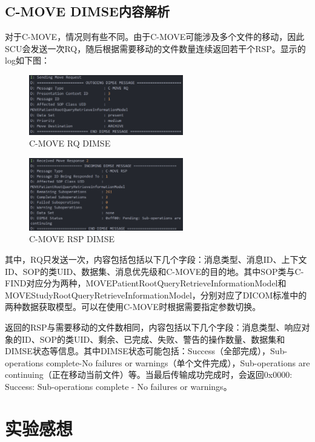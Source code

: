 \documentclass[UTF8]{ctexart}
\begin{document}
\subsection{C-MOVE DIMSE内容解析}
对于C-MOVE，情况则有些不同。由于C-MOVE可能涉及多个文件的移动，因此SCU会发送一次RQ，随后根据需要移动的文件数量连续返回若干个RSP。显示的log如下图：
\begin{figure}[H]
    \centering
    \includegraphics[width=0.6\textwidth]{move_outgoing.png}
    \caption{C-MOVE RQ DIMSE}
\end{figure}

\begin{figure}[H]
    \centering
    \includegraphics[width=0.6\textwidth]{move_incoming.png}
    \caption{C-MOVE RSP DIMSE}
\end{figure}

其中，RQ只发送一次，内容包括包括以下几个字段：消息类型、消息ID、上下文ID、SOP的类UID、数据集、消息优先级和C-MOVE的目的地。其中SOP类与C-FIND对应分为两种，MOVEPatientRootQueryRetrieveInformationModel和MOVEStudyRootQueryRetrieveInformationModel，分别对应了DICOM标准中的两种数据获取模型。可以在使用C-MOVE时根据需要指定参数切换。

返回的RSP与需要移动的文件数相同，内容包括以下几个字段：消息类型、响应对象的ID、SOP的类UID、剩余、已完成、失败、警告的操作数量、数据集和DIMSE状态等信息。其中DIMSE状态可能包括：Success（全部完成），Sub-operations complete-No failures or warnings（单个文件完成），Sub-operations are continuing（正在移动当前文件）等。当最后传输成功完成时，会返回0x0000: Success: Sub-operations complete - No failures or warnings。

\section{实验感想}
\end{document}
